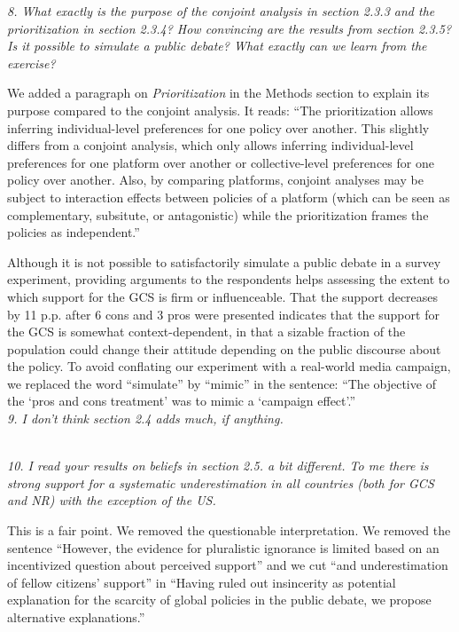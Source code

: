 \documentclass[12pt,english]{article}
\begin{document}
\textit{8. What exactly is the purpose of the conjoint analysis in section 2.3.3 and the prioritization in section 2.3.4? How convincing are the results from section 2.3.5? %
Is it possible to simulate a public debate? What exactly can we learn from the exercise?}

We added a paragraph on \textit{Prioritization} in the Methods section to explain its purpose compared to the conjoint analysis. It reads: ``The prioritization allows inferring individual-level preferences for one policy over another. This slightly differs from a conjoint analysis, which only allows inferring individual-level preferences for one platform over another or collective-level preferences for one policy over another. Also, by comparing platforms, conjoint analyses may be subject to interaction effects between policies of a platform (which can be seen as complementary, subsitute, or antagonistic) while the prioritization frames the policies as independent.''

Although it is not possible to satisfactorily simulate a public debate in a survey experiment, providing arguments to the respondents helps assessing the extent to which support for the GCS is firm or influenceable. That the support decreases by 11 p.p. after 6 cons and 3 pros were presented indicates that the support for the GCS is somewhat context-dependent, in that a sizable fraction of the population could change their attitude depending on the public discourse about the policy. To avoid conflating our experiment with a real-world media campaign, we replaced the word ``simulate'' by ``mimic'' in the sentence: ``The objective of the `pros and cons treatment' was to mimic a `campaign effect'.''
~\\

\textit{9. I don’t think section 2.4 adds much, if anything.}

~\\

\textit{10. I read your results on beliefs in section 2.5. a bit different. To me there is strong support for a systematic underestimation in all countries (both for GCS and NR) with the exception of the US.}

This is a fair point. We removed the questionable interpretation. We removed the sentence ``However, the evidence for pluralistic ignorance is limited based on an incentivized question about perceived support'' and we cut ``and underestimation of fellow citizens' support'' in ``Having ruled out insincerity %
as potential explanation for the scarcity of global policies in the public debate, we propose alternative explanations.''
~\\
\end{document}
